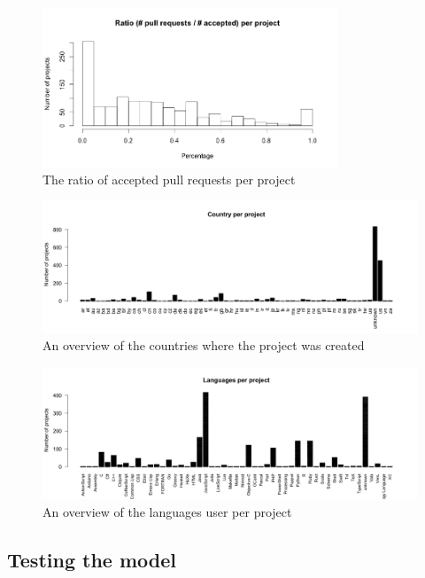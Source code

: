 	    \begin{figure}[h]
	        \includegraphics[width=250pt]{figures/ratio-pull-request-per-project}
	        \caption{The ratio of accepted pull requests per project}
	        \label{fig:ratio-pull-requests-plot}
	    \end{figure}

	    \begin{figure}[t!]
	        \includegraphics[width=500pt]{figures/country-per-project}
	        \caption{An overview of the countries where the project was created}
	        \label{fig:country-plot}
	    \end{figure}

	    \begin{figure}[t!]
	        \includegraphics[width=500pt]{figures/languages-per-project}
	        \caption{An overview of the languages user per project}
	        \label{fig:language-frequency-plot}
	    \end{figure}
    
    \subsection{Testing the model}
